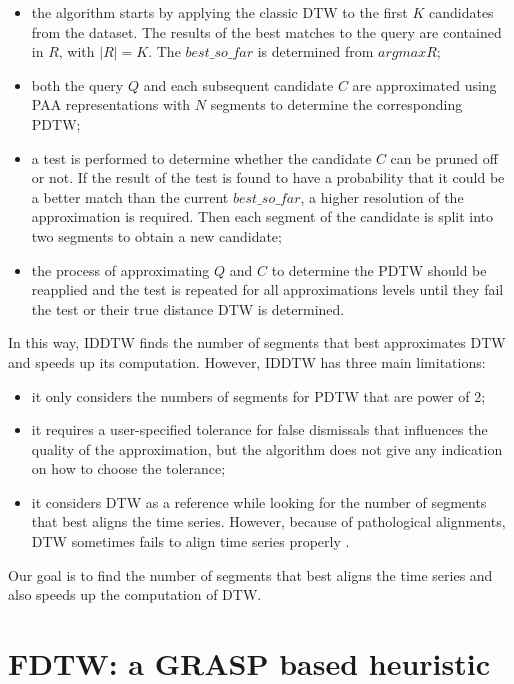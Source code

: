 \begin{itemize}
  \item the algorithm starts by applying the classic DTW  to the first $K$ candidates from the dataset. The results of the best matches to the query are contained in $R$, with $|R|=K$. The $best\_so\_far$ is determined from $argmax{R}$;

\item both the query $Q$ and each subsequent candidate $C$ are approximated using PAA representations with  $N$  segments to determine the corresponding PDTW;

\item a test is performed to determine whether the candidate $C$ can be pruned off or not. If the result of the test is found to have a
probability that it could be a better match than the current $best\_so\_far$, a higher resolution of the approximation is required. Then each segment of the candidate is split into two segments to obtain a new candidate;

\item the process of approximating $Q$ and $C$ to determine the PDTW
should be reapplied and the test is repeated for all approximations levels until they fail the test or their true distance DTW is determined.
\end{itemize}

In this way, IDDTW finds the number of segments that best approximates DTW and speeds up its computation. However, IDDTW has three main limitations:

\begin{itemize}
  \item it only considers the numbers of segments for PDTW that are
  power of 2;
  \item it requires a user-specified tolerance for false dismissals
  that influences the quality of the approximation, but the algorithm does not give any indication on how to choose the tolerance;
  \item it considers DTW as a reference while looking for the  number of segments that best aligns the time series. However, because of pathological alignments, DTW sometimes fails to align time series properly \cite{Keogh_Pazzani_2001}.
\end{itemize}


 Our goal is to find the number of segments that best aligns the time series and also speeds up the computation of DTW.



\section{FDTW: a GRASP based heuristic}
\label{sec:3}

